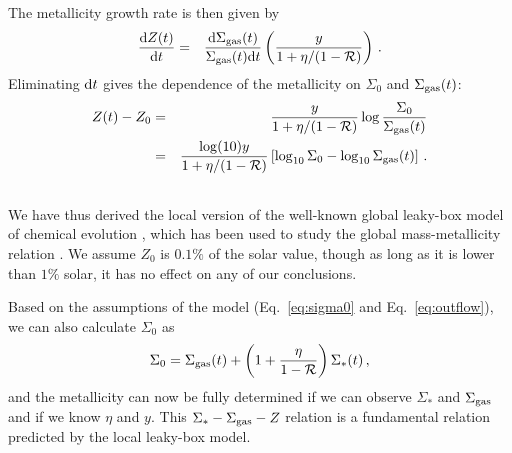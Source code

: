 \documentclass[12pt, appendixfloats, numberedappendix]{emulateapj}
\begin{document}
The metallicity growth rate is then given by
\begin{eqnarray}
\frac{{\rm d} Z(t)}{{\rm d} t} & = & \frac{{\rm d} \Sigma_{\rm gas}(t)}{\Sigma_{\rm gas}(t) {\rm d} t} \left( \frac{y}{1+\eta/(1-\mathcal{R})} \right) \,\mathrm{.}
\end{eqnarray}
Eliminating ${\rm d} t$ gives the dependence of the metallicity on $\Sigma_0$ and $\Sigma_{\rm gas}(t)$:
\begin{eqnarray}
Z(t) - Z_0 & = & \frac{y}{1+\eta/(1-\mathcal{R})} \log \frac{\Sigma_0}{\Sigma_{\rm gas}(t)} \nonumber \\
 & = & \frac{\log(10)y}{1+\eta/(1-\mathcal{R})} \left[ \log_{10} \Sigma_0 - \log_{10} \Sigma_{\rm gas}(t) \right] \,\mathrm{.} \nonumber \\
 & & 
\label{eq:metalgas}
\end{eqnarray}
\noindent 
We have thus derived the local version of the well-known global leaky-box model of chemical evolution \citep[\eg][]{tinsley80a},
which has been used to study the global mass-metallicity relation \citep[\eg][]{zahid14a, belfiore16a}.
We assume $Z_0$ is $0.1\%$ of the solar value, though as long as it is lower than $1\%$ solar, it has no effect on any of our conclusions.

Based on the assumptions of the model (Eq.~\ref{eq:sigma0} and Eq.~\ref{eq:outflow}), we can also calculate $\Sigma_0$ as
\begin{equation}
\Sigma_0 = \Sigma_{\rm gas}(t) + \left(1+\frac{\eta}{1-\mathcal{R}}\right) \Sigma_{*}(t)\,\mathrm{,}
\end{equation}
and the metallicity can now be fully determined if we can observe $\Sigma_{*}$ and $\Sigma_{\rm gas}$ and if we know $\eta$ and $y$.
This $\Sigma_{*}-\Sigma_{\rm gas}-Z$ relation is a fundamental relation predicted by the local leaky-box model. 
\end{document}
